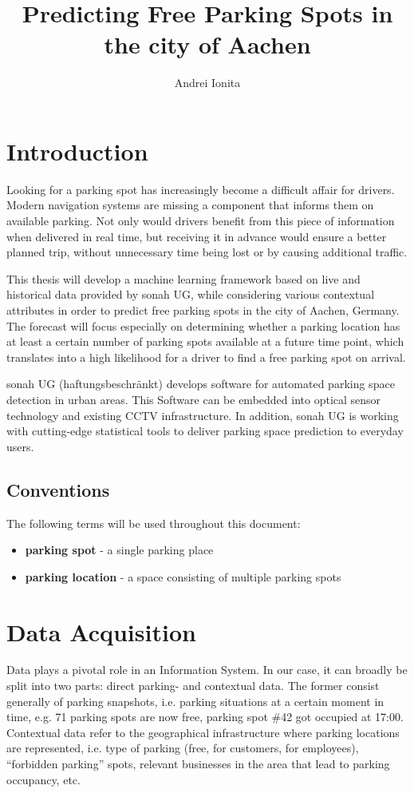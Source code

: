 \documentclass{article}
\begin{document}
\title{Predicting Free Parking Spots in the city of Aachen}
\author{Andrei Ionita}

\maketitle

\section{Introduction}
Looking for a parking spot has increasingly become a difficult affair for drivers. Modern navigation systems are missing a component that informs them on available parking. Not only would drivers benefit from this piece of information when delivered in real time, but receiving it in advance would ensure a better planned trip, without unnecessary time being lost or by causing additional traffic.

\vspace{2mm}
This thesis will develop a machine learning framework based on live and historical data provided by sonah UG, while considering various contextual attributes in order to predict free parking spots in the city of Aachen, Germany. The forecast will focus especially on determining whether a parking location has at least a certain number of parking spots available at a future time point, which translates into a high likelihood for a driver to find a free parking spot on arrival.

\vspace{2mm}
sonah UG (haftungsbeschr\"ankt) develops software for automated parking space detection in urban areas. This Software can be embedded into optical sensor technology and existing CCTV infrastructure. In addition, sonah UG is working with cutting-edge statistical tools to deliver parking space prediction to everyday users. 

\subsection{Conventions}
The following terms will be used throughout this document:
\begin{itemize}
\item \textbf{parking spot} - a single parking place
\item \textbf{parking location} - a space consisting of multiple parking spots
\end{itemize}

\section{Data Acquisition}
Data plays a pivotal role in an Information System. In our case, it can broadly be split into two parts: direct parking- and contextual data. The former consist generally of parking snapshots, i.e. parking situations at a certain moment in time, e.g. 71 parking spots are now free, parking spot \#42 got occupied at 17:00. Contextual data refer to the geographical infrastructure where parking locations are represented, i.e. type of parking (free, for customers, for employees), ``forbidden parking'' spots, relevant businesses in the area that lead to parking occupancy, etc.
\end{document}
